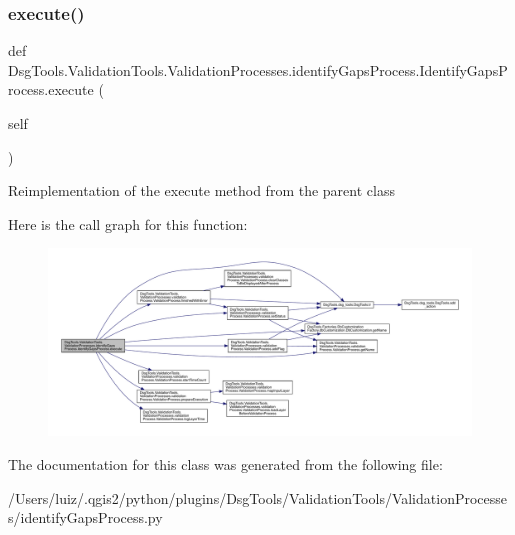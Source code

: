 \subsubsection{\texorpdfstring{execute()}{execute()}}
{\footnotesize\ttfamily def Dsg\+Tools.\+Validation\+Tools.\+Validation\+Processes.\+identify\+Gaps\+Process.\+Identify\+Gaps\+Process.\+execute (\begin{DoxyParamCaption}\item[{}]{self }\end{DoxyParamCaption})}

\begin{DoxyVerb}Reimplementation of the execute method from the parent class
\end{DoxyVerb}
 Here is the call graph for this function\+:
\nopagebreak
\begin{figure}[H]
\begin{center}
\leavevmode
\includegraphics[width=350pt]{class_dsg_tools_1_1_validation_tools_1_1_validation_processes_1_1identify_gaps_process_1_1_identify_gaps_process_ace3b684d421f9349a039c62437d3be93_cgraph}
\end{center}
\end{figure}


The documentation for this class was generated from the following file\+:\begin{DoxyCompactItemize}
\item 
/\+Users/luiz/.\+qgis2/python/plugins/\+Dsg\+Tools/\+Validation\+Tools/\+Validation\+Processes/identify\+Gaps\+Process.\+py\end{DoxyCompactItemize}
